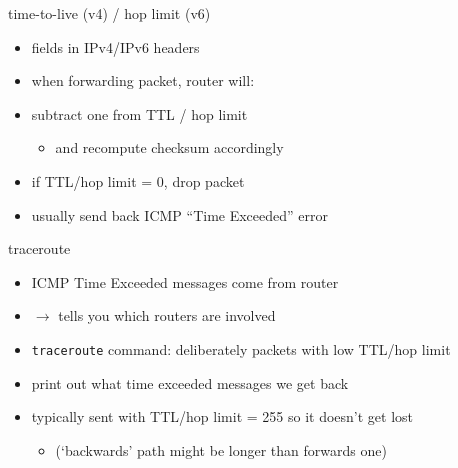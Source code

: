 \begin{frame}{time-to-live (v4) / hop limit (v6)}
    \begin{itemize}
    \item fields in IPv4/IPv6 headers
    \vspace{.5cm}
    \item when forwarding packet, router will:
    \item subtract one from TTL / hop limit
        \begin{itemize}
        \item and recompute checksum accordingly
        \end{itemize}
    \item if TTL/hop limit = 0, drop packet
    \item usually send back ICMP ``Time Exceeded'' error
    \end{itemize}
\end{frame}

\begin{frame}{traceroute}
    \begin{itemize}
    \item ICMP Time Exceeded messages come from router
    \item $\rightarrow$ tells you which routers are involved
    \vspace{.5cm}
    \item<2-> \texttt{traceroute} command: deliberately packets with low TTL/hop limit
    \item<2-> print out what time exceeded messages we get back
    \item<2-> typically sent with TTL/hop limit = 255 so it doesn't get lost
        \begin{itemize}
        \item (`backwards' path might be longer than forwards one)
        \end{itemize}
    \end{itemize}
\end{frame}

